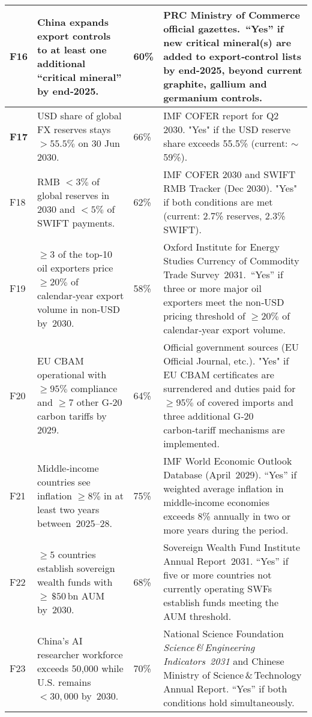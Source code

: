 \documentclass{article}
\begin{document}
\begin{longtable}{@{}>{\bfseries}p{} p{} p{} p{}@{}}
F16 & China expands export controls to at least one additional “critical mineral” by end‑2025. & 60\% & PRC Ministry of Commerce official gazettes. “\!Yes” if new critical mineral(s) are added to export‑control lists by end‑2025, beyond current graphite, gallium and germanium controls. \\
\midrule

F17 & USD share of global FX reserves stays $>55.5\%$ on 30 Jun 2030. & 66\% & IMF COFER report for Q2 2030. "\!Yes" if the USD reserve share exceeds 55.5\% (current: $\sim$59\%). \\
\midrule

F18 & RMB $<3\%$ of global reserves in 2030 and $<5\%$ of SWIFT payments. & 62\% & IMF COFER 2030 and SWIFT RMB Tracker (Dec 2030). "\!Yes" if both conditions are met (current: 2.7\% reserves, 2.3\% SWIFT). \\
\midrule

F19 & $\geq 3$ of the top‑10 oil exporters price $\geq 20\%$ of calendar‑year export volume in non‑USD by 2030. & 58\% & Oxford Institute for Energy Studies Currency of Commodity Trade Survey 2031. “\!Yes” if three or more major oil exporters meet the non‑USD pricing threshold of $\geq 20\%$ of calendar‑year export volume. \\
\midrule

F20 & EU CBAM operational with $\geq 95\%$ compliance and $\geq 7$ other G‑20 carbon tariffs by 2029. & 64\% & Official government sources (EU Official Journal, etc.). "\!Yes" if EU CBAM certificates are surrendered and duties paid for $\geq 95\%$ of covered imports and three additional G‑20 carbon‑tariff mechanisms are implemented. \\
\midrule

F21 & Middle‑income countries see inflation $\geq 8\%$ in at least two years between 2025–28. & 75\% & IMF World Economic Outlook Database (April 2029). “\!Yes” if weighted average inflation in middle‑income economies exceeds 8\% annually in two or more years during the period. \\
\midrule

F22 & $\geq 5$ countries establish sovereign wealth funds with $\geq\,\$50\,\mathrm{bn}$ AUM by 2030. & 68\% & Sovereign Wealth Fund Institute Annual Report 2031. “\!Yes” if five or more countries not currently operating SWFs establish funds meeting the AUM threshold. \\
\midrule

F23 & China’s AI researcher workforce exceeds 50{,}000 while U.S. remains $<30{,}000$ by 2030. & 70\% & National Science Foundation \emph{Science\,\&\,Engineering Indicators 2031} and Chinese Ministry of Science\,\&\,Technology Annual Report. “\!Yes” if both conditions hold simultaneously. \\
\midrule


\end{longtable}
\end{document}
